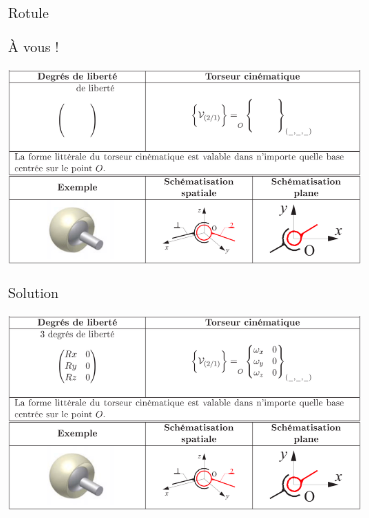 \documentclass[
  ignorenonframetext,
  aspectratio=169,
  c]{beamer}
\begin{document}
\begin{frame}{Rotule}
\label{rotule}
\begin{block}{À vous !}
\begin{center}
\includegraphics[width=0.7\textwidth,height=\textheight]{CM3/Liaison-rotule-00.png}
\end{center}
\end{block}

\begin{block}{Solution}
\begin{center}
\includegraphics[width=0.7\textwidth,height=\textheight]{CM3/Liaison-rotule-01.png}
\end{center}
\end{block}
\end{frame}
\end{document}
